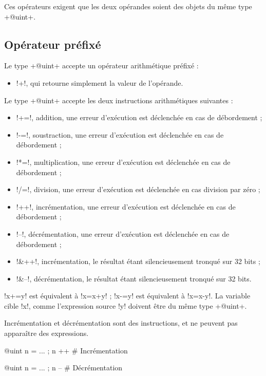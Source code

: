 {Ces opérateurs exigent que les deux opérandes soient des objets du même type \ggst+@uint+.

\subsection{Opérateur préfixé}
Le type \ggst+@uint+ accepte un opérateur arithmétique préfixé :
\begin{itemize}
  \item \ggst!+!, qui retourne simplement la valeur de l'opérande.
\end{itemize}


Le type \ggst+@uint+ accepte les deux instructions arithmétiques suivantes :
\begin{itemize}
  \item \ggst!+=!, addition, une erreur d'exécution est déclenchée en cas de débordement ;
  \item \ggst!-=!, soustraction, une erreur d'exécution est déclenchée en cas de débordement ;
  \item \ggst!*=!, multiplication, une erreur d'exécution est déclenchée en cas de débordement ;
  \item \ggst!/=!, division, une erreur d'exécution est déclenchée en cas division par zéro ;
  \item \ggst!++!, incrémentation, une erreur d'exécution est déclenchée en cas de débordement ;
  \item \ggst!--!, décrémentation, une erreur d'exécution est déclenchée en cas de débordement ;
  \item \ggst!&++!, incrémentation, le résultat étant silencieusement tronqué sur 32 bits ;
  \item \ggst!&--!, décrémentation, le résultat étant silencieusement tronqué sur 32 bits.
\end{itemize}

\ggst!x+=y! est équivalent à \ggst!x=x+y! ; \ggst!x-=y! est équivalent à \ggst!x=x-y!.
La variable cible \ggst!x!, comme l'expression source \ggst!y! doivent être du même type \ggst+@uint+.

Incrémentation et décrémentation sont des instructions, et ne peuvent pas apparaître des expressions.
\begin{galgas3}
@uint n = ... ; n ++ # Incrémentation
\end{galgas3}

\begin{galgas3}
@uint n = ... ; n -- # Décrémentation
\end{galgas3}




}

